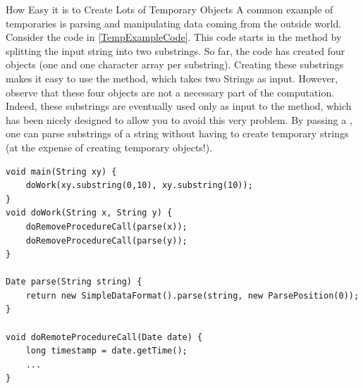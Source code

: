 
\begin{example}{How Easy it is to Create Lots of Temporary Objects}
A common example of temporaries is parsing
and manipulating data coming from the outside world. 
Consider the code in \autoref{TempExampleCode}. This code starts in
the  method by splitting the input string into two substrings. So
far, the code has created four objects (one  and one character
array per substring). 
Creating these substrings makes it easy to use the  method, which
takes two Strings as input. However, observe
that these four objects are not a necessary part of the computation. Indeed,
these substrings are eventually used only as input to the
  method, which has been nicely designed to
allow you to avoid this very problem. By passing a , one
can parse substrings of a string without having to create temporary strings (at
the expense of creating temporary  objects!).
\end{example}



\begin{lstlisting}[float,caption=Code that constructs 8 temporary objects to handle two dates.,label=TempExampleCode]
void main(String xy) {
	doWork(xy.substring(0,10), xy.substring(10));
}	
void doWork(String x, String y) {
	doRemoveProcedureCall(parse(x));
	doRemoveProcedureCall(parse(y));
}
	
Date parse(String string) {
	return new SimpleDataFormat().parse(string, new ParsePosition(0));
}

void doRemoteProcedureCall(Date date) {
	long timestamp = date.getTime();
	...
}
\end{lstlisting}




